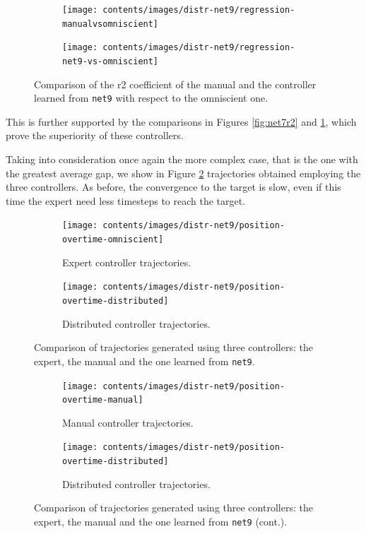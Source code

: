 \begin{figure}[!htb]
	\centering
	\begin{subfigure}[h]{0.49\textwidth}
		\centering
		\texttt{[image: contents/images/distr-net9/regression-manualvsomniscient]}%
	\end{subfigure}
	\hfill
	\begin{subfigure}[h]{0.49\textwidth}
		\centering
		\texttt{[image: contents/images/distr-net9/regression-net9-vs-omniscient]}
	\end{subfigure}
	\caption[Evaluation of the \gls{r2} coefficient of \texttt{net9} .]{Comparison of 
		the \gls{r2} coefficient of the manual and the controller 
		learned from \texttt{net9} with respect to the omniscient one.}
	\label{fig:net9r2}
\end{figure}
This is further supported by the comparisons in Figures \ref{fig:net7r2} and 
\ref{fig:net9r2}, which prove the superiority of these controllers.

Taking into consideration once again the more complex case, that is the one with 
the greatest average gap, we show in Figure \ref{fig:net9traj} trajectories 
obtained employing the three controllers. 
As before, the convergence to the target is slow, even if this time the expert need 
less timesteps to reach the target.

\begin{figure}[!htb]
	\begin{center}
		\begin{subfigure}[h]{0.49\textwidth}
			\centering
			\texttt{[image: contents/images/distr-net9/position-overtime-omniscient]}%
			\caption{Expert controller trajectories.}
		\end{subfigure}
		\hfill
		\begin{subfigure}[h]{0.49\textwidth}
			\centering
			\texttt{[image: contents/images/distr-net9/position-overtime-distributed]}
			\caption{Distributed controller trajectories.}
		\end{subfigure}
	\end{center}
	\caption[Evaluation of the trajectories learned by 
	\texttt{net9}.]{Comparison of trajectories generated using three 
		controllers: the expert, the manual and the one learned from \texttt{net9}.}
\end{figure}
\medskip
\begin{figure}[!htb]\ContinuedFloat
	\centering
	\begin{subfigure}[h]{0.49\textwidth}
		\centering
		\texttt{[image: contents/images/distr-net9/position-overtime-manual]}%
		\caption{Manual controller trajectories.}
	\end{subfigure}
	\hfill
	\begin{subfigure}[h]{0.49\textwidth}
		\centering
		\texttt{[image: contents/images/distr-net9/position-overtime-distributed]}
		\caption{Distributed controller trajectories.}
	\end{subfigure}
	\caption[]{Comparison 
		of trajectories generated using three controllers: the expert, the manual 
		and the one learned from \texttt{net9} (cont.).}
	\label{fig:net9traj}
\end{figure}

